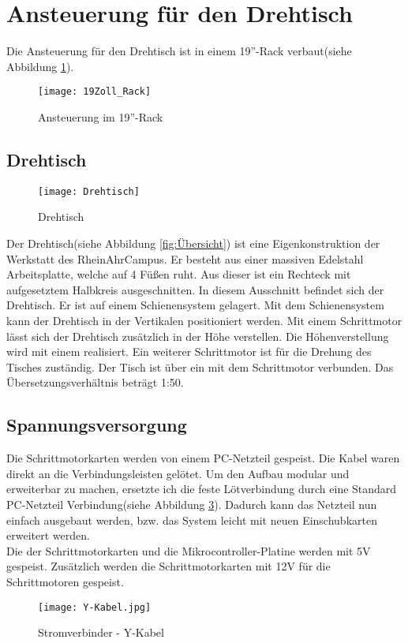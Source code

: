 \section{Ansteuerung für den Drehtisch}
Die Ansteuerung für den Drehtisch ist in einem 19''-Rack verbaut(siehe Abbildung \ref{fig:19Zoll_Rack}).
\begin{figure}[htb]
\centering
\texttt{[image: 19Zoll\_Rack]}
\caption{Ansteuerung im 19''-Rack}
\label{fig:19Zoll_Rack}
\end{figure}
\subsection{Drehtisch}
\begin{figure}[htb]
\centering
\texttt{[image: Drehtisch]}
\caption{Drehtisch}
\label{fig:Drehtisch}
\end{figure}
Der Drehtisch(siehe Abbildung \ref{fig:Übersicht}) ist eine Eigenkonstruktion der Werkstatt des RheinAhrCampus. Er besteht aus einer massiven Edelstahl Arbeitsplatte, welche auf 4 Füßen ruht. Aus dieser ist ein Rechteck mit aufgesetztem Halbkreis ausgeschnitten. In diesem Ausschnitt befindet sich der Drehtisch. Er ist auf einem Schienensystem gelagert. Mit dem Schienensystem kann der Drehtisch in der Vertikalen positioniert werden. Mit einem Schrittmotor lässt sich der Drehtisch zusätzlich in der Höhe verstellen. Die Höhenverstellung wird mit einem  realisiert. Ein weiterer Schrittmotor ist für die Drehung des Tisches zuständig. Der Tisch ist über ein  mit dem Schrittmotor verbunden. Das Übersetzungsverhältnis beträgt 1:50.   
\subsection{Spannungsversorgung}
Die Schrittmotorkarten werden von einem PC-Netzteil gespeist. Die Kabel waren direkt an die Verbindungsleisten gelötet. Um den Aufbau modular und erweiterbar zu machen, ersetzte ich die feste Lötverbindung durch eine Standard PC-Netzteil Verbindung(siehe Abbildung \ref{fig:Y-Kabel}). Dadurch kann das Netzteil nun einfach ausgebaut werden, bzw. das System leicht mit neuen Einschubkarten erweitert werden.\\
Die  der Schrittmotorkarten und die Mikrocontroller-Platine werden mit 5V gespeist. Zusätzlich werden die Schrittmotorkarten mit 12V für die Schrittmotoren gespeist.
\begin{figure}[htb]
\centering
\texttt{[image: Y-Kabel.jpg]}
\caption{Stromverbinder - Y-Kabel}
\label{fig:Y-Kabel}
\end{figure}
